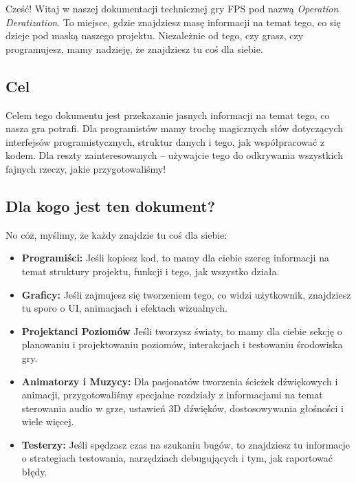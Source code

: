 Cześć! Witaj w naszej dokumentacji technicznej gry FPS pod nazwą \textit{Operation Deratization}. To miejsce, gdzie znajdziesz masę informacji na temat tego, co się dzieje pod maską naszego projektu. Niezależnie od tego, czy grasz, czy programujesz, mamy nadzieję, że znajdziesz tu coś dla siebie.

\subsection{Cel}
Celem tego dokumentu jest przekazanie jasnych informacji na temat tego, co nasza gra potrafi. Dla programistów mamy trochę magicznych słów dotyczących interfejsów programistycznych, struktur danych i tego, jak współpracować z kodem. Dla reszty zainteresowanych – używajcie tego do odkrywania wszystkich fajnych rzeczy, jakie przygotowaliśmy!

\subsection{Dla kogo jest ten dokument?}
No cóż, myślimy, że każdy znajdzie tu coś dla siebie:
\begin{itemize}
\item \textbf{Programiści:} Jeśli kopiesz kod, to mamy dla ciebie szereg informacji na temat struktury projektu, funkcji i tego, jak wszystko działa.
\item \textbf{Graficy:} Jeśli zajmujesz się tworzeniem tego, co widzi użytkownik, znajdziesz tu sporo o UI, animacjach i efektach wizualnych.
\item \textbf{Projektanci Poziomów} Jeśli tworzysz światy, to mamy dla ciebie sekcję o planowaniu i projektowaniu poziomów, interakcjach i testowaniu środowiska gry.
\item \textbf{Animatorzy i Muzycy:} Dla pasjonatów tworzenia ścieżek dźwiękowych i animacji, przygotowaliśmy specjalne rozdziały z informacjami na temat sterowania audio w grze, ustawień 3D dźwięków, dostosowywania głośności i wiele więcej.
\item \textbf{Testerzy:} Jeśli spędzasz czas na szukaniu bugów, to znajdziesz tu informacje o strategiach testowania, narzędziach debugujących i tym, jak raportować błędy.
\end{itemize}

